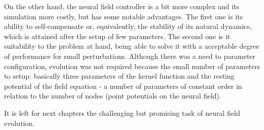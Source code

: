 On the other hand, the neural field controller is a bit more complex
and its simulation more costly, but has some notable advantages. The
first one is its ability to self-compensate or, equivalently, the
stability of its natural dynamics, which is attained after the setup
of few parameters. The second one is it suitability to the problem at
hand, being able to solve it with a acceptable degree of performance
for small perturbations. Although there was a need to parameter
configuration, evolution was not required because the small number of
parameters to setup: basically three parameters of the kernel function
and the resting potential of the field equation - a number of
parameters of constant order in relation to the number of nodes (point potentials
on the neural field).

It is left for next chapters the challenging but promising task of
neural field evolution.









